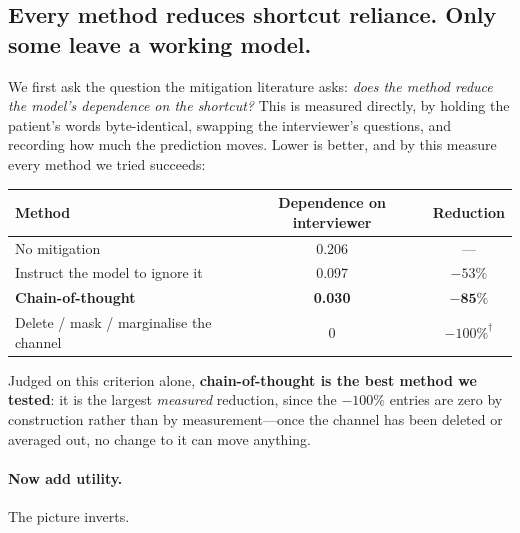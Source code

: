 \documentclass{article}
\begin{document}
\subsection{Every method reduces shortcut reliance. Only some leave a working
model.}
\label{sec:reveal}

We first ask the question the mitigation literature asks: \emph{does the method
reduce the model's dependence on the shortcut?} This is measured directly, by
holding the patient's words byte-identical, swapping the interviewer's
questions, and recording how much the prediction moves. Lower is better, and by
this measure every method we tried succeeds:

\begin{center}
\begin{tabular}{lcc}
\toprule
Method & Dependence on interviewer & Reduction \\
\midrule
No mitigation & 0.206 & --- \\
Instruct the model to ignore it & 0.097 & $-53\%$ \\
\textbf{Chain-of-thought} & \textbf{0.030} & $\mathbf{-85\%}$ \\
Delete / mask / marginalise the channel & 0 & $-100\%^\dagger$ \\
\bottomrule
\end{tabular}
\end{center}

\noindent Judged on this criterion alone, \textbf{chain-of-thought is the best
method we tested}: it is the largest \emph{measured} reduction, since the
$-100\%$ entries are zero by construction rather than by measurement---once the
channel has been deleted or averaged out, no change to it can move anything.

\paragraph{Now add utility.} The picture inverts.
\end{document}
